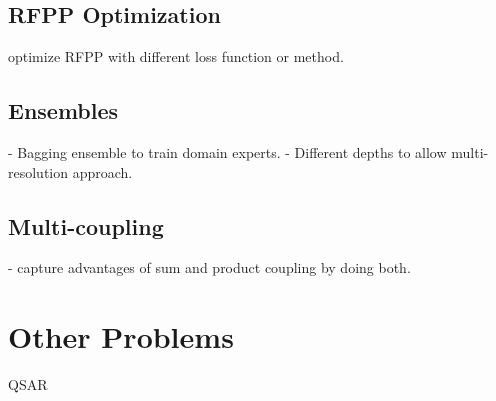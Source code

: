 \subsection{RFPP Optimization}

optimize RFPP with different loss function or method.

\subsection{Ensembles}

- Bagging ensemble to train domain experts.
- Different depths to allow multi-resolution approach.


\subsection{Multi-coupling}

- capture advantages of sum and product coupling by doing both.


\section{Other Problems}

QSAR


